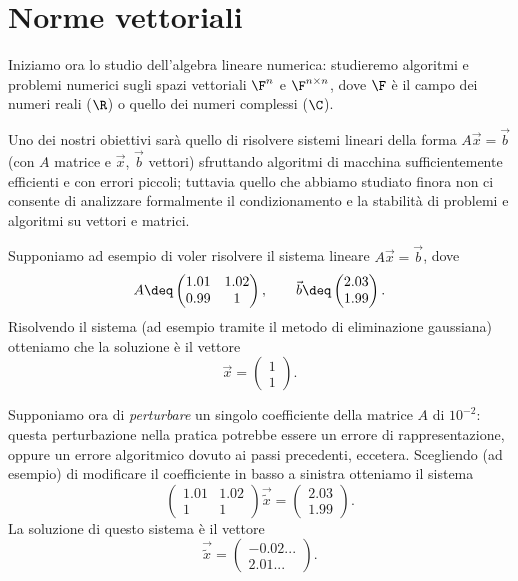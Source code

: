 \section{Norme vettoriali}

Iniziamo ora lo studio dell'algebra lineare numerica: studieremo algoritmi e problemi numerici sugli spazi vettoriali $\F^n$ e $\Mat{\F, n, n}$, dove $\F$ è il campo dei numeri reali ($\R$) o quello dei numeri complessi ($\C$). 

Uno dei nostri obiettivi sarà quello di risolvere sistemi lineari della forma $A\vec x = \vec b$ (con $A$ matrice e $\vec x$, $\vec b$ vettori) sfruttando algoritmi di macchina sufficientemente efficienti e con errori piccoli; tuttavia quello che abbiamo studiato finora non ci consente di analizzare formalmente il condizionamento e la stabilità di problemi e algoritmi su vettori e matrici.

\begin{example}\label{exmpl:mat_malcond}
    Supponiamo ad esempio di voler risolvere il sistema lineare $A\vec x = \vec b$, dove \[
        A \deq \begin{pmatrix}
            1.01 & 1.02 \\ 0.99 & 1
        \end{pmatrix}, \qquad \vec b \deq \begin{pmatrix}
            2.03 \\ 1.99
        \end{pmatrix}.
    \] Risolvendo il sistema (ad esempio tramite il metodo di eliminazione gaussiana) otteniamo che la soluzione è il vettore \[
        \vec x = \begin{pmatrix}
            1 \\ 1
        \end{pmatrix}.
    \]

    Supponiamo ora di \emph{perturbare} un singolo coefficiente della matrice $A$ di $10^{-2}$: questa perturbazione nella pratica potrebbe essere un errore di rappresentazione, oppure un errore algoritmico dovuto ai passi precedenti, eccetera. Scegliendo (ad esempio) di modificare il coefficiente in basso a sinistra otteniamo il sistema \[
        \begin{pmatrix}
            1.01 & 1.02 \\ 1 & 1
        \end{pmatrix}\vec{\tilde x} = \begin{pmatrix}
            2.03 \\ 1.99
        \end{pmatrix}.
    \] La soluzione di questo sistema è il vettore \[
        \vec{\tilde x} = \begin{pmatrix}
            -0.02... \\ 2.01...
        \end{pmatrix}.
    \]   
\end{example}

